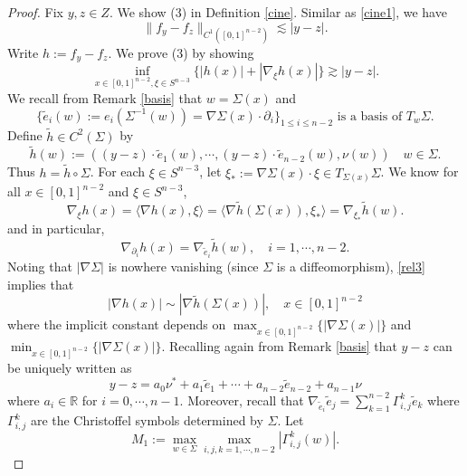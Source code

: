 \documentclass[11pt,a4paper,reqno]{amsart}
\newcommand{\R}{\mathbb{R}}
\newcommand{\1}{\mathbf{1}}
\numberwithin{equation}{section}
\theoremstyle{plain}
\theoremstyle{definition}
\theoremstyle{remark}
\begin{document}
\begin{proof}
Fix $y,z \in Z$. We show (3) in Definition \ref{cine}. Similar as \eqref{cine1}, we have
\begin{equation}\label{dou1}
  \|f_y-f_{z}\|_{C^1([0,1]^{n-2})} \lesssim |y-z|.
\end{equation}
Write
$h:= f_y-f_{z}$. We prove (3) by showing
\begin{equation}\label{cine2}
  \inf_{x \in [0,1]^{n-2}, \xi \in S^{n-3}} \{ |h(x)| + |\nabla_\xi h(x)|  \} \gtrsim  |y-z|.
\end{equation}
We recall from Remark \ref{basis} that $w=\Sigma(x)$ and
$$  \{\tilde e_i(w):= e_i(\Sigma^{-1}(w))= \nabla \Sigma(x) \cdot \partial_i\}_{1\le i \le n-2} \mbox{ is a basis of $T_{w}\Sigma$}. $$
Define
$\tilde h  \in C^2(\Sigma)$ by
\begin{equation}\label{th}
  \tilde h(w):= ((y-z) \cdot \tilde e_1(w), \cdots,(y-z) \cdot \tilde e_{n-2}(w), \nu(w))  \quad w \in \Sigma.
\end{equation}
Thus $h=\tilde h \circ \Sigma$. For each $\xi \in S^{n-3}$, let $\xi_\ast:= \nabla \Sigma(x) \cdot \xi \in T_{\Sigma(x)} \Sigma$. We know for all $x \in [0,1]^{n-2}$ and $\xi \in S^{n-3}$,
\begin{equation}\label{rel3}
 \nabla_\xi h (x)= \langle\nabla h (x), \xi \rangle = \langle\nabla \tilde h (\Sigma(x)), \xi_\ast \rangle = \nabla_{\xi_\ast} \tilde h (w).
\end{equation}
and in particular,
\begin{equation} \label{chain}
  \nabla_{\partial_i} h (x) = \nabla_{\tilde e_i} \tilde h (w), \quad i =1, \cdots, n-2.
\end{equation}
Noting that $|\nabla \Sigma|$ is nowhere vanishing (since $\Sigma$ is a diffeomorphism), \eqref{rel3} implies that
\begin{equation}\label{rel4}
  |\nabla h (x)| \sim  |\nabla \tilde h (\Sigma(x))|, \quad x \in [0,1]^{n-2}
\end{equation}
where the implicit constant depends on $\max_{x \in [0,1]^{n-2}}\{|\nabla \Sigma(x)|\}$ and $\min_{x \in [0,1]^{n-2}}\{|\nabla \Sigma(x)|\}$.
Recalling again from Remark  \ref{basis} that
$y-z$ can be uniquely written as
$$  y-z =  a_0 \nu^\ast + a_1 \tilde e_1 + \cdots + a_{n-2} \tilde e_{n-2} + a_{n-1} \nu
$$
where $a_i\in \R$ for $i=0, \cdots, n-1$.
Moreover, recall that $\nabla_{\tilde e_i}\tilde e_j= \sum_{k=1}^{n-2}\Gamma_{i,j}^k \tilde e_k$ where $\Gamma_{i,j}^k$ are the Christoffel symbols determined by $\Sigma$. Let
\begin{equation}\label{M1}
  M_1:= \max_{w \in \Sigma}\max_{i,j,k=1, \cdots, n-2} |\Gamma_{i,j}^k(w)|.

\end{equation}
\end{proof}
\end{document}
